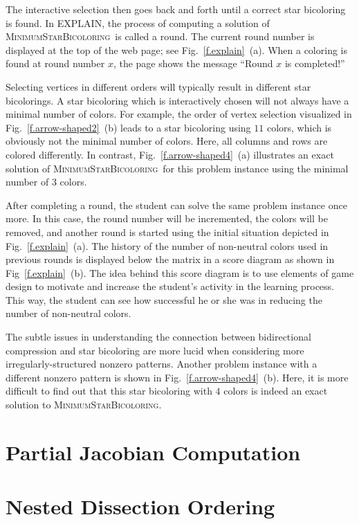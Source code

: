 \documentclass[12pt, oneside]{book}
\newcommand{\MinStaBic}{\textsc{MinimumStarBicoloring}}
\begin{document}
The interactive selection then goes back and forth until a correct star bicoloring is
found. In EXPLAIN, the process of computing a solution of \MinStaBic\ is called a round.
The current round number is displayed at the top of the web page; see
Fig.~\ref{f.explain}~(a). When a coloring is found at round number $x$, the page shows
the message ``Round $x$ is completed!''

Selecting vertices in different orders will typically result in different star
bicolorings. A star bicoloring which is interactively chosen will not always have a
minimal number of colors. For example, the order of vertex selection visualized in
Fig.~\ref{f.arrow-shaped2}~(b) leads to a star bicoloring using $11$ colors, which is
obviously not the minimal number of colors. Here, all columns and rows are colored
differently. In contrast, Fig.~\ref{f.arrow-shaped4}~(a) illustrates an exact solution of
\MinStaBic\ for this problem instance using the minimal number of $3$ colors.

After completing a round, the student can solve the same problem instance once more. In
this case, the round number will be incremented, the colors will be removed, and another
round is started using the initial situation depicted in Fig.~\ref{f.explain}~(a). The
history of the number of non-neutral colors used in previous rounds is displayed below
the matrix in a score diagram as shown in Fig~\ref{f.explain}~(b). The idea behind this
score diagram is to use elements of game design to motivate and increase the student's
activity in the learning process. This way, the student can see how successful he or she
was in reducing the number of non-neutral colors.

The subtle issues in understanding the connection between bidirectional compression and
star bicoloring are more lucid when considering more irregularly-structured nonzero
patterns. Another problem instance with a different nonzero pattern is shown in
Fig.~\ref{f.arrow-shaped4}~(b). Here, it is more difficult to find out that this star
bicoloring with $4$ colors is indeed an exact solution to \MinStaBic.

\section{Partial Jacobian Computation}

\section{Nested Dissection Ordering}
\end{document}
